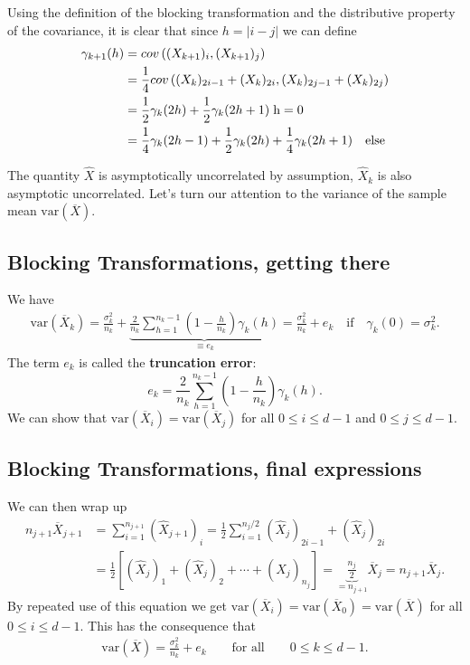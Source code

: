 \documentclass[%
oneside,                 %
final,                   %
10pt]{article}
\begin{document}
Using the
definition of the blocking transformation and the distributive
property of the covariance, it is clear that since $h =|i-j|$
we can define
\begin{align}
\gamma_{k+1}(h) &= cov\left( ({X}_{k+1})_{i}, ({X}_{k+1})_{j} \right) \nonumber \\
&=  \frac{1}{4}cov\left( ({X}_{k})_{2i-1} + ({X}_{k})_{2i}, ({X}_{k})_{2j-1} + ({X}_{k})_{2j} \right) \nonumber \\
&=  \frac{1}{2}\gamma_{k}(2h) + \frac{1}{2}\gamma_k(2h+1) \hspace{0.1cm} \mathrm{h = 0} \\
&=\frac{1}{4}\gamma_k(2h-1) + \frac{1}{2}\gamma_k(2h) + \frac{1}{4}\gamma_k(2h+1) \quad \mathrm{else}
\end{align}

The quantity $\hat{X}$ is asymptotically uncorrelated by assumption, $\hat{X}_k$ is also asymptotic uncorrelated. Let's turn our attention to the variance of the sample
mean $\mathrm{var}(\overline{X})$. 

\subsection*{Blocking Transformations, getting there}
We have
\begin{align}
\mathrm{var}(\overline{X}_k) = \frac{\sigma_k^2}{n_k} + \underbrace{\frac{2}{n_k} \sum_{h=1}^{n_k-1}\left( 1 - \frac{h}{n_k} \right)\gamma_k(h)}_{\equiv e_k} = \frac{\sigma^2_k}{n_k} + e_k \quad \text{if} \quad \gamma_k(0) = \sigma_k^2. 
\end{align}
The term $e_k$ is called the \textbf{truncation error}: 
\begin{equation}
e_k = \frac{2}{n_k} \sum_{h=1}^{n_k-1}\left( 1 - \frac{h}{n_k} \right)\gamma_k(h). 
\end{equation}
We can show that $\mathrm{var}(\overline{X}_i) = \mathrm{var}(\overline{X}_j)$ for all $0 \leq i \leq d-1$ and $0 \leq j \leq d-1$. 

\subsection*{Blocking Transformations, final expressions}

We can then wrap up
\begin{align}
n_{j+1} \overline{X}_{j+1}  &= \sum_{i=1}^{n_{j+1}} (\hat{X}_{j+1})_i =  \frac{1}{2}\sum_{i=1}^{n_{j}/2} (\hat{X}_{j})_{2i-1} + (\hat{X}_{j})_{2i} \nonumber \\
&= \frac{1}{2}\left[ (\hat{X}_j)_1 + (\hat{X}_j)_2 + \cdots + (\hat{X}_j)_{n_j} \right] = \underbrace{\frac{n_j}{2}}_{=n_{j+1}} \overline{X}_j = n_{j+1}\overline{X}_j. 
\end{align}
By repeated use of this equation we get $\mathrm{var}(\overline{X}_i) = \mathrm{var}(\overline{X}_0) = \mathrm{var}(\overline{X})$ for all $0 \leq i \leq d-1$. This has the consequence that
\begin{align}
\mathrm{var}(\overline{X}) = \frac{\sigma_k^2}{n_k} + e_k \qquad \text{for all} \qquad 0 \leq k \leq d-1. \label{eq:convergence}
\end{align}
\end{document}
